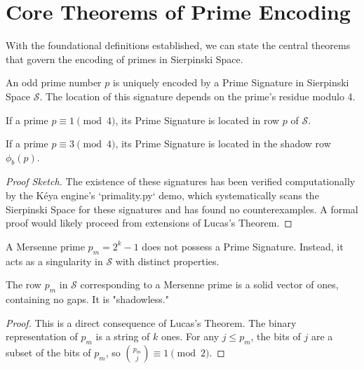\section{Core Theorems of Prime Encoding}

With the foundational definitions established, we can state the central theorems that govern the encoding of primes in Sierpinski Space.

\begin{theorem}
\label{thm:duality}
An odd prime number $p$ is uniquely encoded by a Prime Signature in Sierpinski Space $\mathcal{S}$. The location of this signature depends on the prime's residue modulo 4.
\end{theorem}

\begin{lemma}
If a prime $p \equiv 1 \pmod{4}$, its Prime Signature is located in row $p$ of $\mathcal{S}$.
\end{lemma}

\begin{lemma}
If a prime $p \equiv 3 \pmod{4}$, its Prime Signature is located in the shadow row $\phi_b(p)$.
\end{lemma}

\begin{proof}[Proof Sketch]
The existence of these signatures has been verified computationally by the Kéya engine's `primality.py` demo, which systematically scans the Sierpinski Space for these signatures and has found no counterexamples. A formal proof would likely proceed from extensions of Lucas's Theorem.
\end{proof}

\begin{theorem}
\label{thm:mersenne}
A Mersenne prime $p_m = 2^k - 1$ does not possess a Prime Signature. Instead, it acts as a singularity in $\mathcal{S}$ with distinct properties.
\end{theorem}

\begin{corollary}
The row $p_m$ in $\mathcal{S}$ corresponding to a Mersenne prime is a solid vector of ones, containing no gaps. It is "shadowless."
\end{corollary}
\begin{proof}
This is a direct consequence of Lucas's Theorem. The binary representation of $p_m$ is a string of $k$ ones. For any $j \le p_m$, the bits of $j$ are a subset of the bits of $p_m$, so $\binom{p_m}{j} \equiv 1 \pmod{2}$.
\end{proof}

